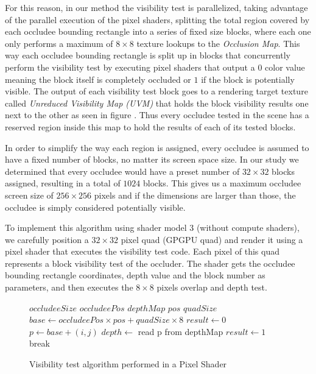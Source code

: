 \documentclass[10pt, conference]{IEEEtran}
\begin{document}
For this reason, in our method the visibility test is parallelized, taking advantage of the parallel execution of the pixel shaders, 
splitting the total region covered by each occludee bounding rectangle into a series of fixed size blocks, where each one only performs 
a maximum of $8 \times 8$ texture lookups to the \emph{Occlusion Map}. 
This way each occludee bounding rectangle is split up in  blocks that concurrently perform the visibility test by executing pixel shaders that 
output a $0$ color value meaning the block itself is completely occluded or $1$ if the block is potentially visible. 
The output of each visibility test block goes to a rendering target texture called \emph{Unreduced Visibility Map (UVM)} that holds 
the block visibility results one next to the other as seen in figure . 
Thus every occludee tested in the scene has a reserved region inside this map to hold the results of each of its tested blocks.\

In order to simplify the way each region is assigned, every occludee is assumed to have a fixed number of blocks, no matter its screen space size. 
In our study we determined that every occludee would have a preset number of $32 \times 32$ blocks assigned, resulting in a total of $1024$ blocks. 
This gives us a maximum occludee screen size of $256 \times 256$ pixels and if the dimensions are larger than those, the occludee is simply considered potentially visible.\

To implement this algorithm using shader model 3 (without compute shaders), we carefully position a $32 \times 32$ pixel quad (GPGPU quad) and render it using a pixel 
shader that executes the visibility test code. 
Each pixel of this quad represents a block visibility test of the occluder. 
The shader gets the occludee bounding rectangle coordinates, depth value and the block number as parameters, and then executes the $8 \times 8$ pixels 
overlap and depth test.\

\begin{figure}[!hbp]
	
	\begin{algorithmic}[1]
		\REQUIRE $occludeeSize$
		\REQUIRE $occludeePos$ 
		\REQUIRE $depthMap$
		\REQUIRE $pos$ 
		\REQUIRE $quadSize$
		\STATE $base \leftarrow occludeePos \times pos + quadSize \times 8$
		\STATE $result \leftarrow 0$ 
				\STATE $p \leftarrow base + (i, j)$
				\STATE $depth \leftarrow$ read p from depthMap
					\STATE $result \leftarrow 1$ 
					\STATE break
				\ENDIF
			\ENDFOR
		\ENDFOR
	\end{algorithmic}
	\caption{Visibility test algorithm performed in a Pixel Shader}
	\label{algorithm8by8}
\end{figure}
\end{document}
